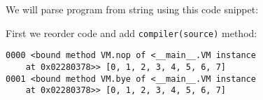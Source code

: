 
We will parse program from string using this code snippet:


First we reorder code and add \verb|compiler(source)| method:

\begin{lstlisting}
0000 <bound method VM.nop of <__main__.VM instance
	at 0x02280378>> [0, 1, 2, 3, 4, 5, 6, 7]
0001 <bound method VM.bye of <__main__.VM instance
	at 0x02280378>> [0, 1, 2, 3, 4, 5, 6, 7]
\end{lstlisting}
